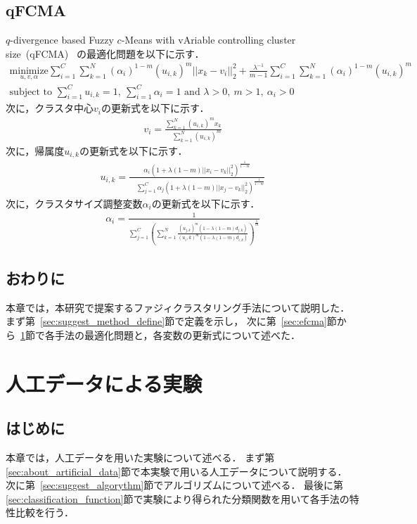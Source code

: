 \documentclass[a4j,12pt,dvipdfmx,oneside]{jsbook}
\theoremstyle{definition}
\begin{document}
 \section{qFCMA}\label{sec:qfcma}
 
 $q$-divergence based Fuzzy $c$-Means with vAriable controlling cluster size~(qFCMA)~\cite{qFCMA}
 の最適化問題を以下に示す．
 \begin{align}
  \underset{u,v,\alpha}{\text{minimize}}
  \sum_{i=1}^C\sum_{k=1}^N(\alpha_{i})^{1-m}(u_{i,k})^m||x_k-v_i||_2^2
  +\frac{\lambda^{-1}}{m-1}\sum_{i=1}^C\sum_{k=1}^N(\alpha_{i})^{1-m}(u_{i,k})^m\\
  {\text{subject to }}\sum_{i=1}^Cu_{i,k}=1,~\sum_{i=1}^C\alpha_{i}=1{\text{ and }}\lambda>0,~m>1,~\alpha_{i}>0
 \end{align}
 次に，クラスタ中心$v_{i}$の更新式を以下に示す．
 \begin{align}
  v_{i}=\frac{\sum_{k=1}^N(u_{i,k})^mx_{k}}{\quad\sum_{k=1}^N(u_{i,k})^{m}}
 \end{align}
 次に，帰属度$u_{i,k}$の更新式を以下に示す．
 \begin{align}
  u_{i,k}=\frac{\alpha_{i}(1+\lambda(1-m)||x_i-v_k||_2^2)^\frac{1}{1-m}}{\quad\sum_{j=1}^C\alpha_{j}(1+\lambda(1-m)||x_j-v_k||_2^2)^\frac{1}{1-m}}
 \end{align}
 次に，クラスタサイズ調整変数$\alpha_{i}$の更新式を以下に示す．
 \begin{align}
 \alpha_{i}=\frac{1}{\sum_{j=1}^C\left(\sum_{k=1}^N\frac{(u_{j,k})^m(1-\lambda(1-m)d_{j,k})}{(u_i,k)^m(1-\lambda(1-m)d_{i,k})}\right)^{\frac{1}{m}}}
 \end{align}

 \section{おわりに}\label{sec:suggest_method_summary}
 本章では，本研究で提案するファジィクラスタリング手法について説明した．
 まず第~\ref{sec:suggest_method_define}節で定義を示し，
 次に第~\ref{sec:efcma}節から~\ref{sec:qfcma}節で各手法の最適化問題と，各変数の更新式について述べた．
 
 
 
\chapter{人工データによる実験}\label{chap:artificial_data}

 \section{はじめに}\label{sec:artificial_data_intro}
 本章では，人工データを用いた実験について述べる．
 まず第\ref{sec:about_artificial_data}節で本実験で用いる人工データについて説明する．
 次に第~\ref{sec:suggest_algorythm}節でアルゴリズムについて述べる．
 最後に第\ref{sec:classification_function}節で実験により得られた分類関数を用いて各手法の特性比較を行う．
 
\end{document}
